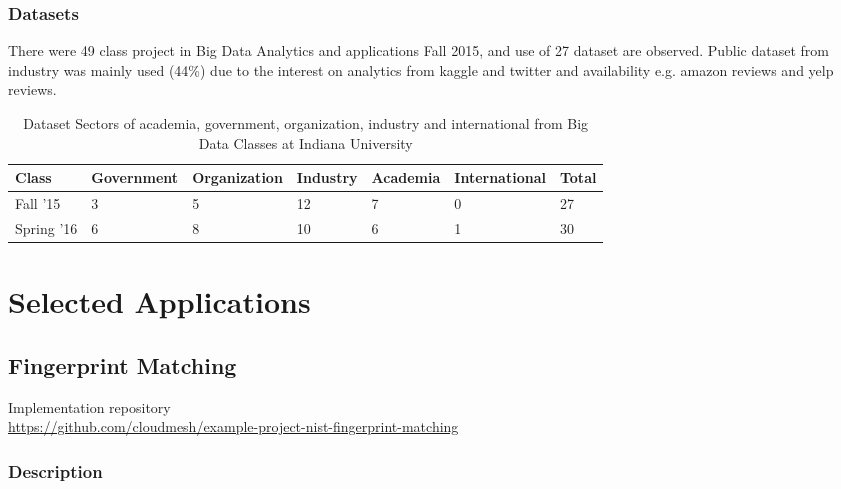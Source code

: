 \documentclass[9pt,twocolumn,twoside]{styles/osajnl}
\begin{document}
\subsubsection{Datasets}

There were 49 class project in Big Data Analytics and applications Fall 2015,
and use of 27 dataset are observed. Public dataset from industry was mainly
used (44\%) due to the interest on analytics from kaggle and twitter and
availability e.g. amazon reviews and yelp reviews.

\begin{table}[htb]
  \begin{center}
    \begin{small}
      \begin{tabular}{l|l|l|l|l|l|l}

    Class      & Government & Organization & Industry & Academia & International & Total \\ \hline \hline
    Fall '15   & 3          & 5            & 12       & 7        & 0             & 27    \\ \hline
    Spring '16 & 6          & 8            & 10       & 6        & 1             & 30    \\ \hline

      \end{tabular}
      \caption{Dataset Sectors of academia, government, organization,
        industry and international from Big Data Classes at Indiana
        University}
      \label{tab:dataset-sector-iu}
    \end{small}
  \end{center}
\end{table}



\section{Selected Applications}

\subsection{Fingerprint Matching}

Implementation repository\\
\url{https://github.com/cloudmesh/example-project-nist-fingerprint-matching}

\subsubsection{Description}
\end{document}
